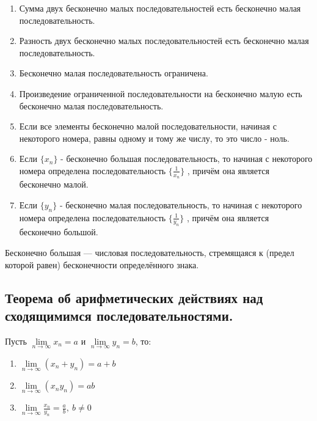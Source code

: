 \documentclass{article}
\begin{document}
\begin{enumerate}
	\item Сумма двух бесконечно малых последовательностей есть бесконечно малая последовательность.
	\item Разность двух бесконечно малых последовательностей есть бесконечно малая последовательность.
	\item Бесконечно малая последовательность ограничена.
	\item Произведение ограниченной последовательности на бесконечно малую есть бесконечно малая последовательность.
	\item Если все элементы бесконечно малой последовательности, начиная с некоторого номера, равны одному и тому же числу, то это число - ноль.
	\item Если $\{x_{n}\}$ - бесконечно большая последовательность, то начиная с некоторого номера определена последовательность $\{\frac{1}{x_{n}}\}$ , причём она является бесконечно малой.
	\item Если $\{y_{n}\}$ - бесконечно малая последовательность, то начиная с некоторого номера определена последовательность $\{\frac{1}{y_{n}}\}$ , причём она является бесконечно большой.
\end{enumerate}

 Бесконечно большая — числовая последовательность, стремящаяся к (предел которой равен) бесконечности определённого знака.

\subsection{Теорема об арифметических действиях над сходящимимся последовательностями.}

 Пусть $\lim\limits_{n \to \infty}x_n = a$ и $\lim\limits_{n \to \infty}y_n = b$, то:
\begin{enumerate}
	\item $\lim\limits_{n \to \infty}(x_n + y_n) = a + b$
	\item $\lim\limits_{n \to \infty}(x_ny_n) = ab$
	\item $\lim\limits_{n \to \infty}\frac{x_n}{y_n} = \frac{a}{b},\ b \neq 0$
\end{enumerate}
\end{document}
